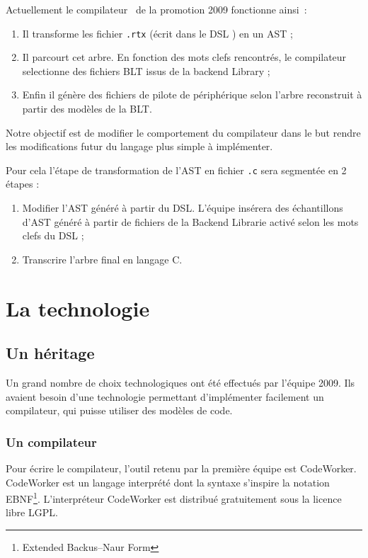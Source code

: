 \documentclass{rtxreport}
\begin{document}
Actuellement le compilateur \rtx\ de la promotion 2009 fonctionne ainsi~:
\begin{enumerate}
\item Il transforme les fichier \texttt{.rtx} (écrit dans le DSL \rtx) en un AST ;
\item Il parcourt cet arbre. En fonction des mots clefs rencontrés, le
compilateur selectionne des fichiers BLT issus de la backend Library ; %
\item Enfin il génère des fichiers de pilote de périphérique selon l'arbre
reconstruit à partir des modèles de la BLT.
\end{enumerate}

Notre objectif est de modifier le comportement du compilateur dans le but
rendre les modifications futur du langage plus simple à implémenter.

Pour cela l'étape de transformation de l'AST en fichier \texttt{.c} sera
segmentée en 2 étapes :
\begin{enumerate}
\item Modifier l'AST généré à partir du DSL. L'équipe insérera des échantillons
d'AST généré à partir de fichiers de la Backend Librarie activé selon les mots
clefs du DSL ;
\item Transcrire l'arbre final en langage C.
\end{enumerate}

\chapter{La technologie \rtx}

\section{Un héritage}

Un grand nombre de choix technologiques ont été effectués par l'équipe 2009.
Ils avaient besoin d'une technologie permettant d'implémenter facilement un
compilateur, qui puisse utiliser des modèles de code.

\subsection{Un compilateur}

Pour écrire le compilateur, l'outil retenu par la première équipe est
CodeWorker. CodeWorker est un langage interprété dont la syntaxe s'inspire la
notation EBNF\footnote{Extended Backus--Naur Form}. L'interpréteur CodeWorker
est distribué gratuitement sous la licence libre LGPL.
\end{document}

